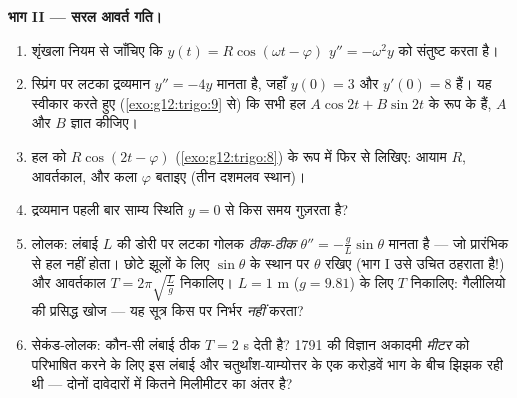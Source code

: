 \begin{problem}
\medskip
\noindent\textbf{भाग II --- सरल आवर्त गति।}
\begin{enumerate}[resume]
  \item शृंखला नियम से जाँचिए कि $y(t) = R\cos(\omega t - \varphi)$ $y'' = -\omega^2 y$ को संतुष्ट करता है।
  \item स्प्रिंग पर लटका द्रव्यमान $y'' = -4y$ मानता है, जहाँ $y(0) = 3$ और $y'(0) = 8$ हैं।
        यह स्वीकार करते हुए (\cref{exo:g12:trigo:9} से) कि सभी हल $A\cos 2t + B\sin 2t$ के रूप के हैं, $A$
        और $B$ ज्ञात कीजिए।
  \item हल को $R\cos(2t - \varphi)$ (\cref{exo:g12:trigo:8}) के रूप में फिर से लिखिए: आयाम $R$, आवर्तकाल,
        और कला $\varphi$ बताइए (तीन दशमलव स्थान)।
  \item द्रव्यमान पहली बार साम्य स्थिति $y = 0$ से किस समय गुज़रता है?
  \item लोलक: लंबाई $L$ की डोरी पर लटका गोलक \emph{ठीक-ठीक} $\theta'' = -\frac gL \sin\theta$ मानता है
        --- जो प्रारंभिक  से हल नहीं होता। छोटे झूलों के लिए $\sin\theta$ के
        स्थान पर $\theta$ रखिए (भाग I उसे उचित ठहराता है!) और आवर्तकाल $T = 2\pi\sqrt{\frac Lg}$
        निकालिए। $L = 1$ m ($g = 9.81$) के लिए $T$ निकालिए: गैलीलियो की प्रसिद्ध
        खोज --- यह सूत्र किस पर निर्भर \emph{नहीं} करता?
  \item सेकंड-लोलक: कौन-सी लंबाई ठीक $T = 2$ s देती है? 1791 की विज्ञान अकादमी
        \emph{मीटर} को परिभाषित करने के लिए इस लंबाई और चतुर्थांश-याम्योत्तर
        के एक करोड़वें भाग के बीच झिझक रही थी --- दोनों दावेदारों में कितने
        मिलीमीटर का अंतर है?
\end{enumerate}


\end{problem}
